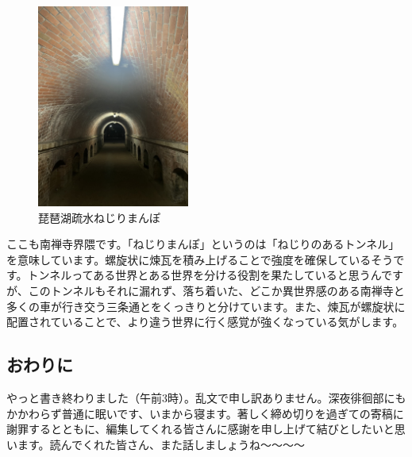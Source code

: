\begin{figure}[H]
    \centering
    \includegraphics[width=5cm]{2025shinki/shinya_haikai/image6.png}
    \caption{琵琶湖疏水ねじりまんぽ}
    \label{fig:enter-label6}
\end{figure}
ここも南禅寺界隈です。「ねじりまんぽ」というのは「ねじりのあるトンネル」を意味しています。螺旋状に煉瓦を積み上げることで強度を確保しているそうです。トンネルってある世界とある世界を分ける役割を果たしていると思うんですが、このトンネルもそれに漏れず、落ち着いた、どこか異世界感のある南禅寺と多くの車が行き交う三条通とをくっきりと分けています。また、煉瓦が螺旋状に配置されていることで、より違う世界に行く感覚が強くなっている気がします。


\subsection{おわりに}
やっと書き終わりました（午前3時）。乱文で申し訳ありません。深夜徘徊部にもかかわらず普通に眠いです、いまから寝ます。著しく締め切りを過ぎての寄稿に謝罪するとともに、編集してくれる皆さんに感謝を申し上げて結びとしたいと思います。読んでくれた皆さん、また話しましょうね～～～～
